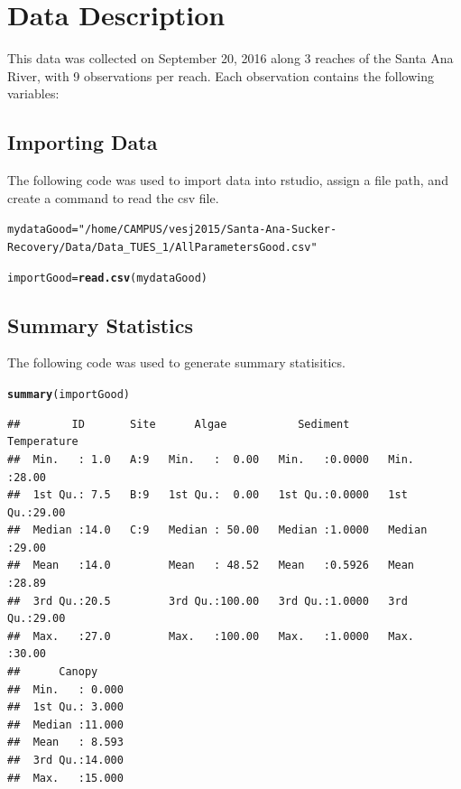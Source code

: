 \documentclass{article}\usepackage[]{graphicx}\usepackage[]{color}
\makeatletter
\newcommand{\hlstr}[1]{\textcolor[rgb]{0.192,0.494,0.8}{#1}}%
\newcommand{\hlstd}[1]{\textcolor[rgb]{0.345,0.345,0.345}{#1}}%
\newcommand{\hlkwb}[1]{\textcolor[rgb]{0.69,0.353,0.396}{#1}}%
\newcommand{\hlkwd}[1]{\textcolor[rgb]{0.737,0.353,0.396}{\textbf{#1}}}%
\newenvironment{kframe}{%
 \def\at@end@of@kframe{}%
 \ifinner\ifhmode%
  \def\at@end@of@kframe{\end{minipage}}%
  \begin{minipage}{\columnwidth}%
 \fi\fi%
 \def\FrameCommand##1{\hskip\@totalleftmargin \hskip-\fboxsep
 \colorbox{shadecolor}{##1}\hskip-\fboxsep
     \hskip-\linewidth \hskip-\@totalleftmargin \hskip\columnwidth}%
 \MakeFramed {\advance\hsize-\width
   \@totalleftmargin\z@ \linewidth\hsize
   \@setminipage}}%
 {\par\unskip\endMakeFramed%
 \at@end@of@kframe}
\newenvironment{knitrout}{}{} %
\makeatother
\begin{document}
\section{Data Description}

This data was collected on September 20, 2016 along 3 reaches of the Santa Ana River, with 9 observations per reach. Each observation contains the following variables:  

\subsection{Importing Data}

The following code was used to import data into rstudio, assign a file path, and create a command to read the csv file. 
\begin{knitrout}
\color{fgcolor}\begin{kframe}
\begin{alltt}
\hlstd{mydataGood}\hlkwb{=} \hlstr{"/home/CAMPUS/vesj2015/Santa-Ana-Sucker-Recovery/Data/Data_TUES_1/AllParametersGood.csv"}

\hlstd{importGood}\hlkwb{=}\hlkwd{read.csv}\hlstd{(mydataGood)}
\end{alltt}
\end{kframe}
\end{knitrout}
\subsection{Summary Statistics}

The following code was used to generate summary statisitics. 
\begin{knitrout}
\color{fgcolor}\begin{kframe}
\begin{alltt}
\hlkwd{summary}\hlstd{(importGood)}
\end{alltt}
\begin{verbatim}
##        ID       Site      Algae           Sediment       Temperature   
##  Min.   : 1.0   A:9   Min.   :  0.00   Min.   :0.0000   Min.   :28.00  
##  1st Qu.: 7.5   B:9   1st Qu.:  0.00   1st Qu.:0.0000   1st Qu.:29.00  
##  Median :14.0   C:9   Median : 50.00   Median :1.0000   Median :29.00  
##  Mean   :14.0         Mean   : 48.52   Mean   :0.5926   Mean   :28.89  
##  3rd Qu.:20.5         3rd Qu.:100.00   3rd Qu.:1.0000   3rd Qu.:29.00  
##  Max.   :27.0         Max.   :100.00   Max.   :1.0000   Max.   :30.00  
##      Canopy      
##  Min.   : 0.000  
##  1st Qu.: 3.000  
##  Median :11.000  
##  Mean   : 8.593  
##  3rd Qu.:14.000  
##  Max.   :15.000
\end{verbatim}
\end{kframe}
\end{knitrout}
\end{document}
